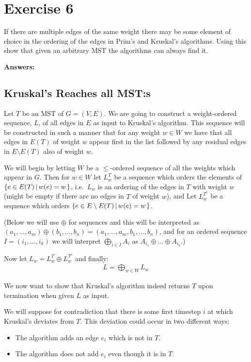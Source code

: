 \documentclass[nobib]{tufte-handout}
\newcommand{\bigset}[3][1]{%
    \ifthenelse{1=#1}{%
        \left\{#2 \left| \, #3 \right.\right\}
    }{%
        \left\{#2\right\}
    }
}
\begin{document}
\section{Exercise 6}
If there are multiple edges of the same weight there may be some element of choice in the ordering of the edges in Prim's and Kruskal's algorithms. Using this show that given an arbitrary MST the algorithms can always find it.

\textbf{Answers:} \\ 
\subsection{Kruskal's Reaches all MST:s}
Let $T$ be an MST of $G = (V, E)$. We are going to construct a weight-ordered sequence, $L$, of all edges in $E$ as input to Kruskal's algorithm. This sequence will be constructed in such a manner that for any weight $w \in W$ we have that all edges in $E(T)$ of weight $w$ appear first in the list followed by any residual edges in $E \setminus E(T)$ also of weight $w$.

We will begin by letting $W$ be a $\leq$-ordered sequence of all the weights which appear in $G$. Then for $w \in W$ let $L_w^T$ be a sequence which orders the elements of $\bigset[1]{e \in E(T)}{w(e) = w}$, i.e.\ $L_w$ is an ordering of the edges in $T$ with weight $w$ (might be empty if there are no edges in $T$ of weight $w$), and Let $L_w^{T^c}$ be a sequence which orders $\bigset[1]{e \in E \setminus E(T)}{w(e) = w}$.

(Below we will use $\oplus$ for sequences and this will be interpreted as $(a_1, \ldots, a_m) \oplus (b_1, \ldots, b_n) = (a_1, \ldots, a_m, b_1, \ldots, b_n)$, and for an ordered sequence $I = (i_1, \ldots, i_k)$ we will interpret $\bigoplus\limits_{i \in I} A_i$ as $A_{i_1} \oplus \ldots \oplus A_{i_k}$.)

Now let $L_w = L_w^T \oplus L_w^{T^c}$ and finally:
%
\begin{align*}
    L = \bigoplus_{w \in W} L_w
\end{align*}

We now want to show that Kruskal's algorithm indeed returns $T$ upon termination when given $L$ as input.

We will suppose for contradiction that there is some first timestep $i$ at which Kruskal's deviates from $T$. This deviation could occur in two different ways:

\begin{itemize}
    \item The algorithm adds an edge $e_i$ which is not in $T$.
    \item The algorithm does not add $e_i$ even though it is in $T$.
\end{itemize}
\end{document}
